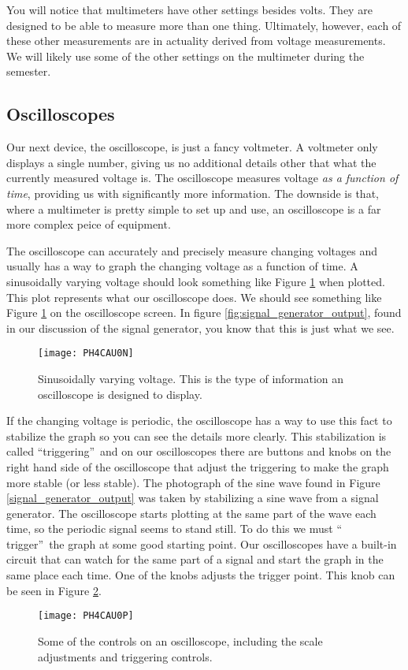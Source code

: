 You will notice that multimeters have
other settings besides volts. They are designed to be able to measure more 
than one thing. Ultimately, however, each of these other measurements are
in actuality derived from voltage measurements. We will likely use some of
the other settings on the multimeter during the semester.

\subsection{Oscilloscopes}

Our next device, the oscilloscope, is just a fancy voltmeter. A voltmeter
only displays a single number, giving us no additional details other
that what the currently measured voltage is. The oscilloscope measures 
voltage \textit{as a function of time}, providing us with significantly more
information. The downside is that, where a multimeter is pretty simple to 
set up and use, an oscilloscope is a far more complex peice of equipment.

The oscilloscope can accurately and precisely measure changing voltages 
and usually
has a way to graph the changing voltage as a function of time. 
A sinusoidally varying voltage should look something like Figure 
\ref{fig:sine_voltage} when
plotted. 
This plot represents what our oscilloscope
does. We should see something like Figure \ref{fig:sine_voltage} 
on the oscilloscope screen. 
In figure \ref{fig:signal_generator_output}, found in our
discussion of the signal generator, you know that this is just what we see.
\begin{figure}[htbp!]
\centering
\texttt{[image: PH4CAU0N]}
\caption[Sinusoidally varying voltage]{Sinusoidally varying voltage. This
is the type of information an oscilloscope is designed to display.}
\label{fig:sine_voltage}
\end{figure}

If the changing voltage is periodic, the oscilloscope has a way to use this
fact to stabilize the graph so you can see the details more clearly. This
stabilization is called \textquotedblleft triggering\textquotedblright\ and
on our oscilloscopes there are buttons and knobs on the right hand side of
the oscilloscope that adjust the triggering to make the graph more stable
(or less stable). The photograph of the sine wave 
found in Figure \ref{signal_generator_output} was taken by
stabilizing a sine wave from a signal generator. The oscilloscope starts
plotting at the same part of the wave each time, so the periodic signal
seems to stand still. To do this we must \textquotedblleft
trigger\textquotedblright\ the graph at some good starting point. Our
oscilloscopes have a built-in circuit that can watch for the same part of a
signal and start the graph in the same place each time. One of the knobs
adjusts the trigger point. This knob can be seen in Figure
\ref{fig:oscilloscope_control_a}.
\begin{figure}[htbp!]
\centering
\texttt{[image: PH4CAU0P]}
\caption[Some of the controls on an oscilloscope]{Some of the controls
on an oscilloscope, including the scale adjustments and triggering controls.}
\label{fig:oscilloscope_control_a}
\end{figure}

